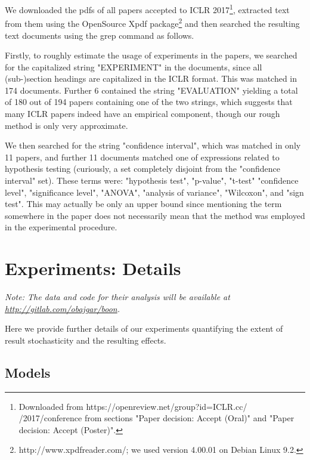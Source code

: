 \documentclass{article}
\begin{document}
\begin{appendices}
We downloaded the pdfs of all papers accepted to ICLR 2017\footnote{Downloaded from https://openreview.net/group?id=ICLR.cc/ /2017/conference from sections "Paper decision: Accept (Oral)" and "Paper decision: Accept (Poster)".}, extracted text from them using the OpenSource Xpdf package\footnote{http://www.xpdfreader.com/; we used version 4.00.01 on Debian Linux 9.2.} and then searched the resulting text documents using the grep command as follows. %

Firstly, to roughly estimate the usage of experiments in the papers, we searched for the capitalized string "EXPERIMENT" in the documents, since all (sub-)section headings are capitalized in the ICLR format. This was matched in 174 documents. Further 6 contained the string "EVALUATION" yielding a total of 180 out of 194 papers containing one of the two strings, which suggests that many ICLR papers indeed have an empirical component, though our rough method is only very approximate.

We then searched for the string "confidence interval", which was matched in only 11 papers, and further 11 documents matched one of expressions related to hypothesis testing (curiously, a set completely disjoint from the "confidence interval" set). These terms were: "hypothesis test", "p-value", "t-test" "confidence level", "significance level", "ANOVA", "analysis of variance", "Wilcoxon", and "sign test". This may actually be only an upper bound since mentioning the term somewhere in the paper does not necessarily mean that the method was employed in the experimental procedure.



\section{Experiments: Details}
\label{app:experiments}

{\it Note: The data and code for their analysis will be available at \url{http://gitlab.com/obajgar/boon}.}

Here we provide further details of our experiments quantifying the extent of result stochasticity and the resulting effects. 

\subsection{Models}


\end{appendices}
\end{document}

